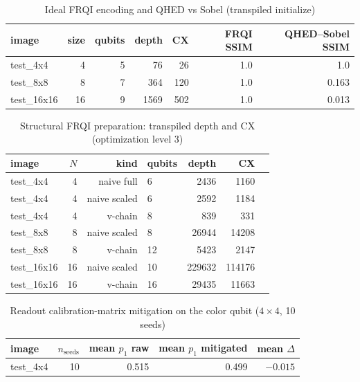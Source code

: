 
\begin{table}[htbp]
\centering
\caption{Ideal FRQI encoding and QHED vs Sobel (transpiled initialize)}
\label{tab:encoding_baseline}
\begin{tabular}{lrrrrrr}
\toprule
image & size & qubits & depth & CX & FRQI SSIM & QHED--Sobel SSIM \\
\midrule
test\_4x4 & 4 & 5 & 76 & 26 & 1.0 & 1.0 \\
test\_8x8 & 8 & 7 & 364 & 120 & 1.0 & 0.163 \\
test\_16x16 & 16 & 9 & 1569 & 502 & 1.0 & 0.013 \\
\bottomrule
\end{tabular}
\end{table}

\begin{table}[htbp]
\centering
\caption{Structural FRQI preparation: transpiled depth and CX (optimization level 3)}
\label{tab:structural_resources}
\small
\begin{tabular}{lrrlrrr}
\toprule
image & $N$ & kind & qubits & depth & CX \\
\midrule
test\_4x4 & 4 & naive full & 6 & 2436 & 1160 \\
test\_4x4 & 4 & naive scaled & 6 & 2592 & 1184 \\
test\_4x4 & 4 & v-chain & 8 & 839 & 331 \\
test\_8x8 & 8 & naive scaled & 8 & 26944 & 14208 \\
test\_8x8 & 8 & v-chain & 12 & 5423 & 2147 \\
test\_16x16 & 16 & naive scaled & 10 & 229632 & 114176 \\
test\_16x16 & 16 & v-chain & 16 & 29435 & 11663 \\
\bottomrule
\end{tabular}
\end{table}

\begin{table}[htbp]
\centering
\caption{Readout calibration-matrix mitigation on the color qubit ($4\times 4$, 10 seeds)}
\label{tab:readout_summary}
\begin{tabular}{lrrrr}
\toprule
image & $n_{\mathrm{seeds}}$ & mean $p_1$ raw & mean $p_1$ mitigated & mean $\Delta$ \\
\midrule
test\_4x4 & 10 & 0.515 & 0.499 & $-0.015$ \\
\bottomrule
\end{tabular}
\end{table}
